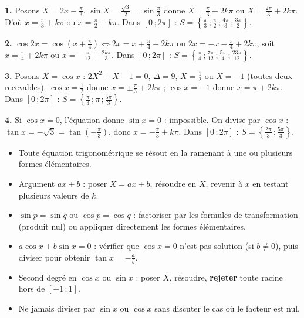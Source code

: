 \documentclass[11pt]{article}
\newcommand{\cle}[1]{{\popxbold\color{popdark}#1}}
\begin{document}
\begin{corrige}[Exercice 1]
\textbf{1.} Posons $X = 2x - \frac{\pi}{3}$. $\sin X = \frac{\sqrt{3}}{2} = \sin\frac{\pi}{3}$ donne $X = \frac{\pi}{3} + 2k\pi$ ou $X = \frac{2\pi}{3} + 2k\pi$. D'où $x = \frac{\pi}{3} + k\pi$ ou $x = \frac{\pi}{2} + k\pi$. Dans $[0\,; 2\pi]$ : $S = \left\{\frac{\pi}{3}\,; \frac{\pi}{2}\,; \frac{4\pi}{3}\,; \frac{3\pi}{2}\right\}$.

\textbf{2.} $\cos 2x = \cos\left(x + \frac{\pi}{4}\right) \iff 2x = x + \frac{\pi}{4} + 2k\pi$ ou $2x = -x - \frac{\pi}{4} + 2k\pi$, soit $x = \frac{\pi}{4} + 2k\pi$ ou $x = -\frac{\pi}{12} + \frac{2k\pi}{3}$. Dans $[0\,; 2\pi]$ : $S = \left\{\frac{\pi}{4}\,; \frac{7\pi}{12}\,; \frac{5\pi}{4}\,; \frac{23\pi}{12}\right\}$.

\textbf{3.} Posons $X = \cos x$ : $2X^2 + X - 1 = 0$, $\Delta = 9$, $X = \frac{1}{2}$ ou $X = -1$ (toutes deux recevables). $\cos x = \frac{1}{2}$ donne $x = \pm\frac{\pi}{3} + 2k\pi$ ; $\cos x = -1$ donne $x = \pi + 2k\pi$. Dans $[0\,; 2\pi]$ : $S = \left\{\frac{\pi}{3}\,; \pi\,; \frac{5\pi}{3}\right\}$.

\textbf{4.} Si $\cos x = 0$, l'équation donne $\sin x = 0$ : impossible. On divise par $\cos x$ : $\tan x = -\sqrt{3} = \tan\left(-\frac{\pi}{3}\right)$, donc $x = -\frac{\pi}{3} + k\pi$. Dans $[0\,; 2\pi]$ : $S = \left\{\frac{2\pi}{3}\,; \frac{5\pi}{3}\right\}$.
\end{corrige}

\begin{aretenir}
\begin{itemize}
\item Toute équation trigonométrique se résout en la \cle{ramenant} à une ou plusieurs formes élémentaires.
\item Argument $ax + b$ : poser $X = ax + b$, résoudre en $X$, revenir à $x$ en testant plusieurs valeurs de $k$.
\item $\sin p = \sin q$ ou $\cos p = \cos q$ : factoriser par les formules de transformation (produit nul) ou appliquer directement les formes élémentaires.
\item $a\cos x + b\sin x = 0$ : vérifier que $\cos x = 0$ n'est pas solution (si $b \neq 0$), puis diviser pour obtenir $\tan x = -\frac{a}{b}$.
\item Second degré en $\cos x$ ou $\sin x$ : poser $X$, résoudre, \textbf{rejeter} toute racine hors de $[-1\,; 1]$.
\item Ne jamais diviser par $\sin x$ ou $\cos x$ sans discuter le cas où le facteur est nul.
\end{itemize}
\end{aretenir}
\end{document}
